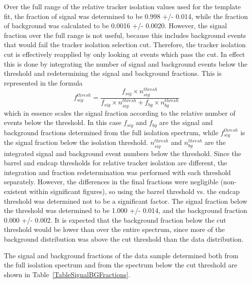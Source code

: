 Over the full range of the relative tracker isolation 
values used for the template fit, 
the fraction of signal was determined to be 
0.998 +/- 0.014, 
while the fraction of background was calculated to be 
0.0016 +/- 0.0020.  
However, the signal fraction over the full 
range is not useful, because this includes 
background events that would fail 
the tracker isolation selection cut.  
Therefore, the tracker isolation cut is effectively 
reapplied by only looking at events which 
pass the cut.  
In effect this is done by integrating 
the number of signal and background events 
below the threshold and redetermining the 
signal and background fractions.  
This is represented in the formula 
\[
f_{sig}^{thresh} = \frac{ f_{sig} \times n_{sig}^{thresh} }{ f_{sig} \times n_{sig}^{thresh} + f_{bg} \times n_{bg}^{thresh} }
\]
which in essence scales the signal fraction 
according to the relative number of events 
below the threshold.  
In this case $f_{sig}$ and $f_{bg}$ are the 
signal and background fractions determined 
from the full isolation spectrum, 
while $f_{sig}^{thresh}$ is the signal fraction 
below the isolation threshold.  
$n_{sig}^{thresh}$ and $n_{bg}^{thresh}$ are the 
integrated signal and background event numbers 
below the threshold.  
Since the barrel and endcap thresholds 
for relative tracker isolation are different, 
the integration and fraction 
redetermination was performed with each 
threshold separately.  
However, the differences in the final fractions 
were negligible (non-existent within significant figures), 
so using the barrel threshold vs. the endcap threshold 
was determined not to be a significant factor.  
The signal fraction below the threshold was determined 
to be 1.000 +/- 0.014, and the background fraction 
0.000 +/- 0.002.  
It is expected that the background fraction below 
the cut threshold would be lower than over the 
entire spectrum, 
since more of the background distribution 
was above the cut threshold than the data distribution.  

The signal and background fractions of the data sample 
determined both from the full isolation spectrum and 
from the spectrum below the cut threshold are shown in 
Table~\ref{TableSignalBGFractions}.  

